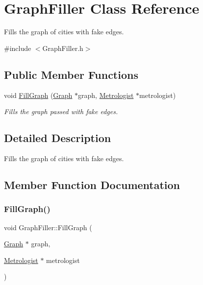 \hypertarget{classGraphFiller}{}\section{Graph\+Filler Class Reference}
\label{classGraphFiller}


Fills the graph of cities with fake edges.  




{\ttfamily \#include $<$Graph\+Filler.\+h$>$}

\subsection*{Public Member Functions}
\begin{DoxyCompactItemize}
\item 
void \hyperlink{classGraphFiller_a355921f1404ff03eabb46f3ef40b9fe3}{Fill\+Graph} (\hyperlink{classGraph}{Graph} $\ast$graph, \hyperlink{classMetrologist}{Metrologist} $\ast$metrologist)
\begin{DoxyCompactList}\small\item\em Fills the graph passed with fake edges. \end{DoxyCompactList}\end{DoxyCompactItemize}


\subsection{Detailed Description}
Fills the graph of cities with fake edges. 

\subsection{Member Function Documentation}
\mbox{\label{classGraphFiller_a355921f1404ff03eabb46f3ef40b9fe3}} 
\subsubsection{\texorpdfstring{Fill\+Graph()}{FillGraph()}}
{\footnotesize\ttfamily void Graph\+Filler\+::\+Fill\+Graph (\begin{DoxyParamCaption}\item[{\hyperlink{classGraph}{Graph} $\ast$}]{graph,  }\item[{\hyperlink{classMetrologist}{Metrologist} $\ast$}]{metrologist }\end{DoxyParamCaption})}



